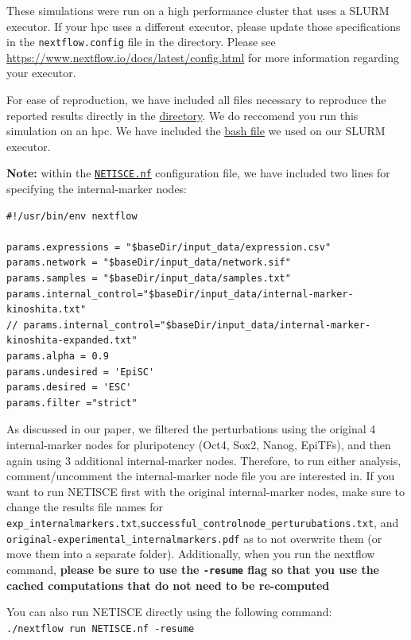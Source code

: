 \documentclass[
]{book}
\begin{document}
These simulations were run on a high performance cluster that uses a SLURM executor. If your hpc uses a different executor, please update those specifications in the \texttt{nextflow.config} file in the directory. Please see \url{https://www.nextflow.io/docs/latest/config.html} for more information regarding your executor.

For ease of reproduction, we have included all files necessary to reproduce the reported results directly in the \href{https://github.com/VeraLiconaResearchGroup/Netisce/tree/main/ipsc_validation}{directory}. We do reccomend you run this simulation on an hpc. We have included the \href{https://github.com/VeraLiconaResearchGroup/Netisce/blob/main/ipsc_validation/run.sh}{bash file} we used on our SLURM executor.

\textbf{Note: } within the \href{https://github.com/VeraLiconaResearchGroup/Netisce/blob/main/ipsc_validation/NETISCE.nf}{\texttt{NETISCE.nf}} configuration file, we have included two lines for specifying the internal-marker nodes:

\begin{verbatim}
#!/usr/bin/env nextflow

params.expressions = "$baseDir/input_data/expression.csv"
params.network = "$baseDir/input_data/network.sif"
params.samples = "$baseDir/input_data/samples.txt"
params.internal_control="$baseDir/input_data/internal-marker-kinoshita.txt"
// params.internal_control="$baseDir/input_data/internal-marker-kinoshita-expanded.txt"
params.alpha = 0.9
params.undesired = 'EpiSC'
params.desired = 'ESC'
params.filter ="strict"
\end{verbatim}

As discussed in our paper, we filtered the perturbations using the original 4 internal-marker nodes for pluripotency (Oct4, Sox2, Nanog, EpiTFs), and then again using 3 additional internal-marker nodes. Therefore, to run either analysis, comment/uncomment the internal-marker node file you are interested in. If you want to run NETISCE first with the original internal-marker nodes, make sure to change the results file names for \texttt{exp\_internalmarkers.txt},\texttt{successful\_controlnode\_perturubations.txt}, and \texttt{original-experimental\_internalmarkers.pdf} as to not overwrite them (or move them into a separate folder). Additionally, when you run the nextflow command, \textbf{please be sure to use the \texttt{-resume} flag so that you use the cached computations that do not need to be re-computed}

You can also run NETISCE directly using the following command: \texttt{./nextflow\ run\ NETISCE.nf\ -resume}
\end{document}
